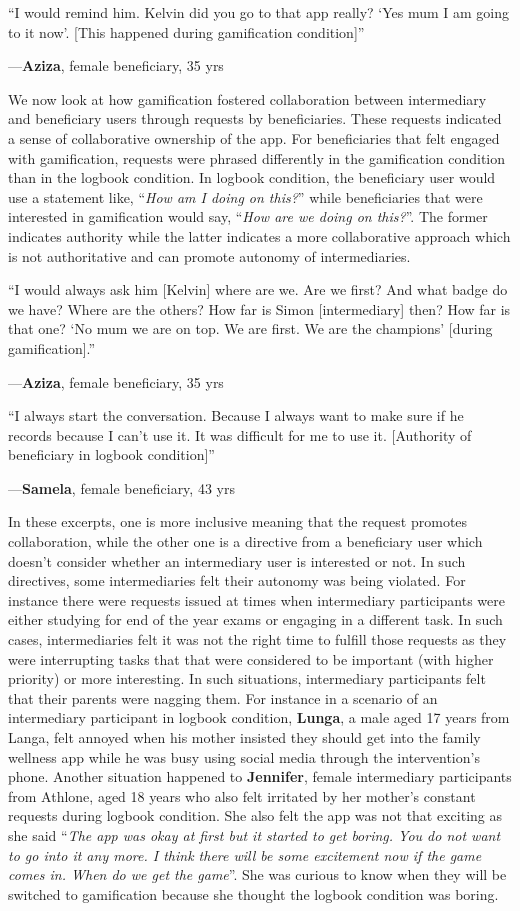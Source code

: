 \documentclass{sig-alternate}
\newenvironment{myquote}
               {\list{}{\rightmargin   \leftmargin
                        \parsep        0in }%
                \item\relax}
               {\endlist}
\newcommand{\userquote}[2]{\begin{samepage}\begin{myquote} 
     \em{\small{#2\begin{flushright}---#1\end{flushright}}}
   \end{myquote}\end{samepage}}
\begin{document}
\userquote{\textbf{Aziza}, female beneficiary, 35 yrs} {``I would remind him. Kelvin did you go to that app really? `Yes mum I am going to it now'. [This happened during gamification condition]''} 

We now look at how gamification fostered collaboration between intermediary and beneficiary users through requests by beneficiaries. These requests indicated a sense of collaborative ownership of the app. For beneficiaries that felt engaged with gamification, requests were phrased differently in the gamification condition than in the logbook condition. In logbook condition, the beneficiary user would use a statement like, ``\emph{How am I doing on this?}'' while beneficiaries that were interested in gamification would say, ``\emph{How are we doing on this?}''. The former indicates authority while the latter indicates a more collaborative approach which is not authoritative and can promote autonomy of intermediaries.

\userquote{\textbf{Aziza}, female beneficiary, 35 yrs}{``I would always ask him [Kelvin] where are we. Are we first? And what badge do we have? Where are the others? How far is Simon [intermediary] then? How far is that one? `No mum we are on top. We are first. We are the champions' [during gamification].''} 

\userquote{\textbf{Samela}, female beneficiary, 43 yrs} {``I always start the conversation. Because I always want to make sure if he records because I can't use it. It was difficult for me to use it. [Authority of beneficiary in logbook condition]''}

In these excerpts, one is more inclusive meaning that the request promotes collaboration, while the other one is a directive from a beneficiary user which doesn't consider whether an intermediary user is interested or not. In such directives, some intermediaries felt their autonomy was being violated. For instance there were requests issued at times when intermediary participants were either studying for end of the year exams or engaging in a different task. In such cases, intermediaries felt it was not the right time to fulfill those requests as they were interrupting tasks that that were considered to be important (with higher priority) or more interesting. In such situations, intermediary participants felt that their parents were nagging them. For instance in a scenario of an intermediary participant in logbook condition, \textbf{Lunga}, a male aged 17 years from Langa, felt annoyed when his mother insisted they should get into the family wellness app while he was busy using social media through the intervention's phone. Another situation happened to \textbf{Jennifer}, female intermediary participants from Athlone, aged 18 years who also felt irritated by her mother's constant requests during logbook condition. She also felt the app was not that exciting as she said ``\emph{The app was okay at first but it started to get boring. You do not want to go into it any more. I think there will be some excitement now if the game comes in. When do we get the game}''. She was curious to know when they will be switched to gamification because she thought the logbook condition was boring.
\end{document}
